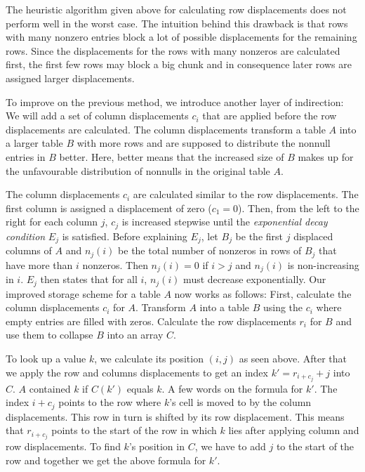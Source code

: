 The heuristic algorithm given above for calculating row displacements does not perform well in the worst case.
The intuition behind this drawback is that rows with many nonzero entries block a lot of possible displacements for the remaining rows.
Since the displacements for the rows with many nonzeros are calculated first, the first few rows may block a big chunk and in consequence later rows are assigned larger displacements.

To improve on the previous method, we introduce another layer of indirection:
We will add a set of column displacements $c_i$ that are applied before the row displacements are calculated.
The column displacements transform a table $A$ into a larger table $B$ with more rows and are supposed to distribute the nonnull entries in $B$ better.
Here, better means that the increased size of $B$ makes up for the unfavourable distribution of nonnulls in the original table $A$.

The column displacements $c_i$ are calculated similar to the row displacements.
The first column is assigned a displacement of zero ($c_1 = 0$).
Then, from the left to the right for each column $j$, $c_j$ is increased stepwise until the \emph{exponential decay condition} $E_j$ is satisfied.
Before explaining $E_j$, let $B_j$ be the first $j$ displaced columns of $A$ and $n_j(i)$ be the total number of nonzeros in rows of $B_j$ that have more than $i$ nonzeros.
Then $n_j(i) = 0$ if $i > j$ and $n_j(i)$ is non-increasing in $i$.
$E_j$ then states that for all $i$, $n_j(i)$ must decrease exponentially.
Our improved storage scheme for a table $A$ now works as follows:
First, calculate the column displacements $c_i$ for $A$.
Transform $A$ into a table $B$ using the $c_i$ where empty entries are filled with zeros.
Calculate the row displacements $r_i$ for $B$ and use them to collapse $B$ into an array $C$.

To look up a value $k$, we calculate its position $(i, j)$ as seen above.
After that we apply the row and columns displacements to get an index $k' = r_{i + c_j} + j$ into $C$.
$A$ contained $k$ if $C(k')$ equals $k$.
A few words on the formula for $k'$.
The index $i + c_j$ points to the row where $k$'s cell is moved to by the column displacements.
This row in turn is shifted by its row displacement.
This means that $r_{i + c_j}$ points to the start of the row in which $k$ lies after applying column and row displacements.
To find $k$'s position in $C$, we have to add $j$ to the start of the row and together we get the above formula for $k'$.
